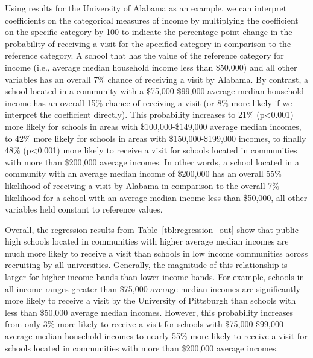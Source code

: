 \documentclass[twoside]{article}
\begin{document}
Using results for the University of Alabama as an example, we can interpret coefficients on the categorical measures of income by multiplying the coefficient on the specific category by 100 to indicate the percentage point change in the probability of receiving a visit for the specified category in comparison to the reference category. A school that has the value of the reference category for income (i.e., average median household income less than \$50,000) and all other variables has an overall 7\% chance of receiving a visit by Alabama. By contrast, a school located in a community with a \$75,000-\$99,000 average median household income has an overall 15\% chance of receiving a visit (or 8\% more likely if we interpret the coefficient directly). This probability increases to 21\% (p<0.001) more likely for schools in areas with \$100,000-\$149,000 average median incomes, to 42\% more likely for schools in areas with \$150,000-\$199,000 incomes, to finally 48\% (p<0.001) more likely to receive a visit for schools located in communities with more than \$200,000 average incomes. In other words, a school located in a community with an average median income of \$200,000 has an overall 55\% likelihood of receiving a visit by Alabama in comparison to the overall 7\% likelihood for a school with an average median income less than \$50,000, all other variables held constant to reference values.

Overall, the regression results from Table~\ref{tbl:regression_out} show that public high schools located in communities with higher average median incomes are much more likely to receive a visit than schools in low income communities across recruiting by all universities. Generally, the magnitude of this relationship is larger for higher income bands than lower income bands. For example, schools in all income ranges greater than \$75,000 average median incomes are significantly more likely to receive a visit by the University of Pittsburgh than schools with less than \$50,000 average median incomes. However, this probability increases from only 3\% more likely to receive a visit for schools with \$75,000-\$99,000 average median household incomes to nearly 55\% more likely to receive a visit for schools located in communities with more than \$200,000 average incomes.
\end{document}
